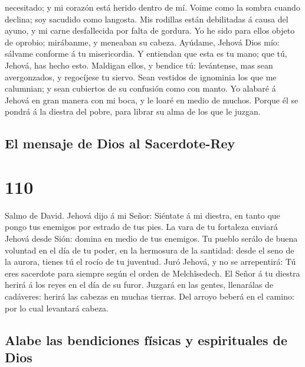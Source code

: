 necesitado; y mi corazón está herido dentro de mí.  Voime
como la sombra cuando declina; soy sacudido como langosta.
 Mis rodillas están debilitadas á causa del ayuno, y mi
carne desfallecida por falta de gordura.  Yo he sido para
ellos objeto de oprobio; mirábanme, y meneaban su cabeza.
 Ayúdame, Jehová Dios mío: sálvame conforme á tu
misericordia.  Y entiendan que esta es tu mano; que tú,
Jehová, has hecho esto.  Maldigan ellos, y bendice tú:
levántense, mas sean avergonzados, y regocíjese tu siervo.
 Sean vestidos de ignominia los que me calumnian; y sean
cubiertos de su confusión como con manto.  Yo alabaré á
Jehová en gran manera con mi boca, y le loaré en medio de muchos.
 Porque él se pondrá á la diestra del pobre, para librar
su alma de los que le juzgan.

\hypertarget{el-mensaje-de-dios-al-sacerdote-rey}{%
\subsection{El mensaje de Dios al
Sacerdote-Rey}\label{el-mensaje-de-dios-al-sacerdote-rey}}

\hypertarget{section-109}{%
\section{110}\label{section-109}}

 Salmo de David. Jehová dijo á mi Señor: Siéntate á mi
diestra, en tanto que pongo tus enemigos por estrado de tus pies.
 La vara de tu fortaleza enviará Jehová desde Sión: domina
en medio de tus enemigos.  Tu pueblo serálo de buena
voluntad en el día de tu poder, en la hermosura de la santidad: desde el
seno de la aurora, tienes tú el rocío de tu juventud. 
Juró Jehová, y no se arrepentirá: Tú eres sacerdote para siempre según
el orden de Melchîsedech.  El Señor á tu diestra herirá á
los reyes en el día de su furor.  Juzgará en las gentes,
llenarálas de cadáveres: herirá las cabezas en muchas tierras.
 Del arroyo beberá en el camino: por lo cual levantará
cabeza.

\hypertarget{alabe-las-bendiciones-fuxedsicas-y-espirituales-de-dios}{%
\subsection{Alabe las bendiciones físicas y espirituales de
Dios}\label{alabe-las-bendiciones-fuxedsicas-y-espirituales-de-dios}}

